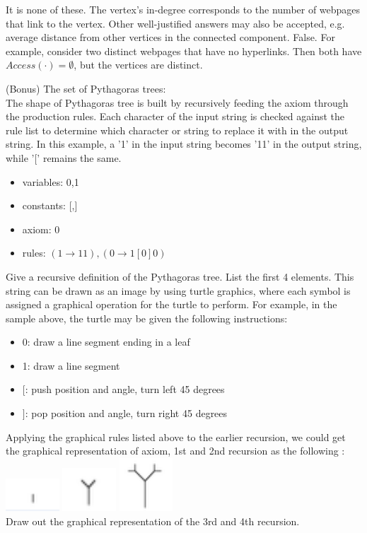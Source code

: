 \documentclass[solution, letterpaper]{cs20inclass}
\begin{document}
\begin{solution}
\subsolution It is none of these.
\subsolution The vertex's in-degree corresponds to the number of webpages that link to the vertex. Other well-justified answers may also be accepted, e.g. average distance from other vertices in the connected component.
\subsolution False. For example, consider two distinct webpages that have no hyperlinks. Then both have $Access(\cdot) = \emptyset$, but the vertices are distinct.
\end{solution}

\problem (Bonus) The set of Pythagoras trees:\\
The shape of Pythagoras tree is built by recursively feeding the axiom through the production rules. Each character of the input string is checked against the rule list to determine which character or string to replace it with in the output string. In this example, a '1' in the input string becomes '11' in the output string, while '[' remains the same. 
\begin{itemize}
\item variables: 0,1
\item constants: [,]
\item axiom: 0
\item rules: $(1\rightarrow 11), (0\rightarrow 1[0]0)$
\end{itemize}
\subproblem Give a recursive definition of the  Pythagoras tree.
\subproblem List the first 4 elements.
\subproblem This string can be drawn as an image by using turtle graphics, where each symbol is assigned a graphical operation for the turtle to perform. For example, in the sample above, the turtle may be given the following instructions:
\begin{itemize}
\item 0: draw a line segment ending in a leaf
\item 1: draw a line segment
\item $[$: push position and angle, turn left 45 degrees
\item $]$: pop position and angle, turn right 45 degrees
\end{itemize}
Applying the graphical rules listed above to the earlier recursion, we could get the graphical representation of axiom, 1st and 2nd recursion as the following :\\
\includegraphics[width=2cm]{0} 
\includegraphics[width=2cm]{1}
\includegraphics[width=2cm]{2}\\
Draw out the graphical representation of the 3rd and 4th recursion.
\end{document}
